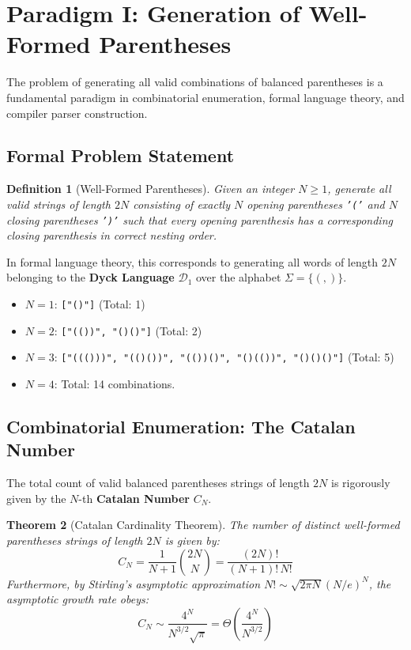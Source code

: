 \documentclass[10pt,journal,compsoc,onecolumn]{IEEEtran}
\newtheorem{theorem}{Theorem}
\newtheorem{definition}[theorem]{Definition}
\begin{document}
\section{Paradigm I: Generation of Well-Formed Parentheses}
\label{sec:parentheses}

The problem of generating all valid combinations of balanced parentheses is a fundamental paradigm in combinatorial enumeration, formal language theory, and compiler parser construction.

\subsection{Formal Problem Statement}
\begin{definition}[Well-Formed Parentheses]
Given an integer $N \ge 1$, generate all valid strings of length $2N$ consisting of exactly $N$ opening parentheses \texttt{'('} and $N$ closing parentheses \texttt{')'} such that every opening parenthesis has a corresponding closing parenthesis in correct nesting order.
\end{definition}

In formal language theory, this corresponds to generating all words of length $2N$ belonging to the \textbf{Dyck Language} $\mathcal{D}_1$ over the alphabet $\Sigma = \{(, )\}$.
\begin{itemize}
    \item $N = 1$: \texttt{["()"]} (Total: 1)
    \item $N = 2$: \texttt{["(())", "()()"]} (Total: 2)
    \item $N = 3$: \texttt{["((()))", "(()())", "(())()", "()(())", "()()()"]} (Total: 5)
    \item $N = 4$: Total: 14 combinations.
\end{itemize}

\subsection{Combinatorial Enumeration: The Catalan Number}
The total count of valid balanced parentheses strings of length $2N$ is rigorously given by the $N$-th \textbf{Catalan Number} $C_N$.

\begin{theorem}[Catalan Cardinality Theorem]
The number of distinct well-formed parentheses strings of length $2N$ is given by:
\begin{equation}
C_N = \frac{1}{N+1}\binom{2N}{N} = \frac{(2N)!}{(N+1)!\,N!}
\label{eq:catalan}
\end{equation}
Furthermore, by Stirling's asymptotic approximation $N! \sim \sqrt{2\pi N}(N/e)^N$, the asymptotic growth rate obeys:
\begin{equation}
C_N \sim \frac{4^N}{N^{3/2}\sqrt{\pi}} = \Theta\left(\frac{4^N}{N^{3/2}}\right)
\label{eq:catalan_asymptotic}
\end{equation}
\end{theorem}
\end{document}
